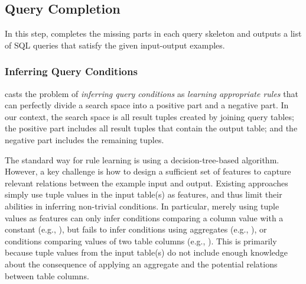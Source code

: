 

\subsection{Query Completion}
\label{sec:completion}

\vspace{-1mm}

In this step, \ourtool completes the missing parts
in each query skeleton and outputs a list of SQL queries
that satisfy the given input-output examples.




\subsubsection{Inferring Query Conditions}
\label{sec:condition}

\ourtool casts the problem of \textit{inferring query conditions} as
 \textit{learning appropriate rules} that can perfectly divide a search space
into a positive part and a negative part. In our context, the search space
is all result tuples created by joining query tables; the positive part
includes all result tuples that contain the output table; and the negative part includes the remaining tuples.

The standard way for rule learning is using a decision-tree-based
algorithm. However, a key challenge is how
to design a sufficient set of features to capture relevant
relations between the example input and output.
Existing approaches~\cite{Tran:2009} simply use
tuple values in the input table(s) as features, 
and thus limit their abilities in inferring non-trivial
conditions. In particular,
merely using tuple values as features can only infer
conditions comparing a column value with a constant
(e.g., ), but
fails to infer conditions using aggregates (e.g., ),
or conditions comparing values of two table columns
(e.g., ).
This is primarily because tuple values from the input table(s)
do not include enough knowledge about the consequence of
applying an aggregate and the potential relations between
table columns.


